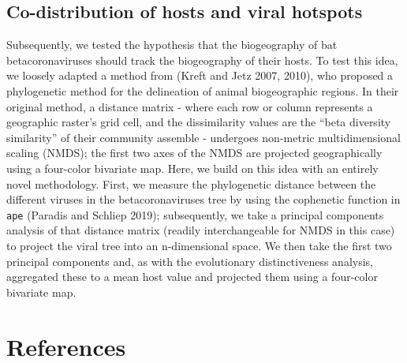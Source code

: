 \documentclass[11pt]{article}
\begin{document}
\hypertarget{co-distribution-of-hosts-and-viral-hotspots}{%
\subsection{Co-distribution of hosts and viral
hotspots}\label{co-distribution-of-hosts-and-viral-hotspots}}

Subsequently, we tested the hypothesis that the biogeography of bat
betacoronaviruses should track the biogeography of their hosts. To test
this idea, we loosely adapted a method from (Kreft and Jetz 2007, 2010),
who proposed a phylogenetic method for the delineation of animal
biogeographic regions. In their original method, a distance matrix -
where each row or column represents a geographic raster's grid cell, and
the dissimilarity values are the ``beta diversity similarity'' of their
community assemble - undergoes non-metric multidimensional scaling
(NMDS); the first two axes of the NMDS are projected geographically
using a four-color bivariate map. Here, we build on this idea with an
entirely novel methodology. First, we measure the phylogenetic distance
between the different viruses in the betacoronaviruses tree by using the
cophenetic function in \texttt{ape} (Paradis and Schliep 2019);
subsequently, we take a principal components analysis of that distance
matrix (readily interchangeable for NMDS in this case) to project the
viral tree into an n-dimensional space. We then take the first two
principal components and, as with the evolutionary distinctiveness
analysis, aggregated these to a mean host value and projected them using
a four-color bivariate map.

\hypertarget{references}{%
\section*{References}\label{references}}
\end{document}
